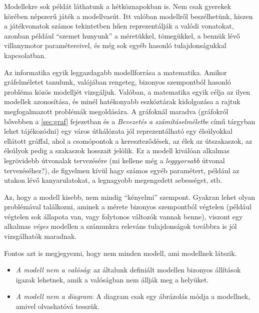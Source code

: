 \begin{pelda}
	Modellekre sok példát láthatunk a hétköznapokban is. Nem csak gyerekek körében népszerű játék a modellvasút. Itt valóban modellről beszélhetünk, hiszen a játékvonatok számos tekintetben hűen reprezentálják a valódi vonatokat, azonban például ``szemet hunyunk'' a méretükkel, tömegükkel, a bennük lévő villanymotor paramétereivel, és még sok egyéb hasonló tulajdonságukkal kapcsolatban.
	
	Az informatika egyik leggazdagabb modellforrása a matematika. Amikor gráfelméletet tanulunk, valójában rengeteg, bizonyos szempontból hasonló probléma közös modelljét vizsgáljuk. Valóban, a matematika egyik célja az ilyen modellek azonosítása, és minél hatékonyabb eszköztárak kidolgozása a rajtuk megfogalmazott problémák megoldására. A gráfoknál maradva (gráfokról bővebben a \ref{sec:graf} fejezetban és a \emph{Bevezetés a számításelméletbe} című tárgyban lehet tájékozódni) egy város úthálózata jól reprezentálható egy élsúlyokkal ellátott gráffal, ahol a csomópontok a kereszteződések, az élek az útszakaszok, az élsúlyok pedig a szakaszok hosszait jelölik. Ez a modell kiválóan alkalmas legrövidebb útvonalak tervezésére (mi kellene még a \emph{leggyorsabb} útvonal tervezéséhez?), de figyelmen kívül hagy számos egyéb paramétert, például az utakon lévő kanyarulatokat, a legnagyobb megengedett sebességet, stb.
\end{pelda}

\begin{megjegyzes}
	Az, hogy a modell kisebb, nem mindig ``kényelmi'' szempont. Gyakran lehet olyan problémával találkozni, aminek a mérete bizonyos szempontból végtelen (például végtelen sok állapota van, vagy folytonos változók vannak benne), viszont egy alkalmas \emph{véges} modellen a számunkra releváns tulajdonságok továbbra is jól vizsgálhatók maradnak.
\end{megjegyzes}

Fontos azt is megjegyezni, hogy nem minden modell, ami modellnek látszik.

\begin{itemize}
	\item \emph{A modell nem a valóság}: az általunk definiált modellen bizonyos állítások igazak lehetnek, amik a valóságban nem állják meg a helyüket.
	\item \emph{A modell nem a diagram}: A diagram csak egy ábrázolás módja a modellnek, amivel olvashatóvá tesszük. 
\end{itemize}

